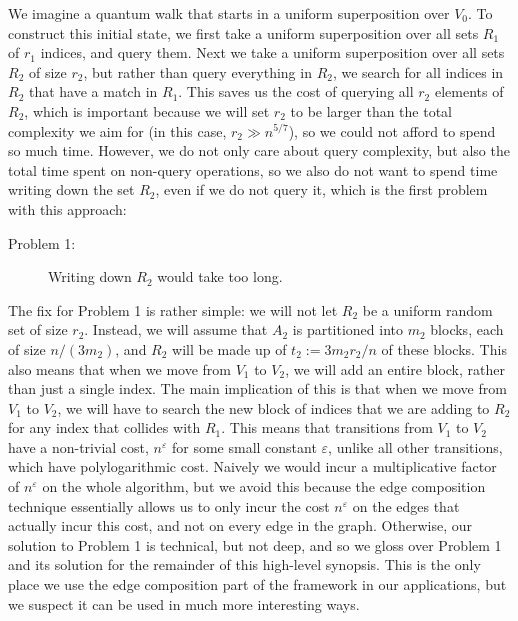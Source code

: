 \documentclass{theoretics}
\renewcommand{\>}{\rangle}
\newcommand{\<}{\langle}
\renewcommand{\(}{\left(}
\renewcommand{\)}{\right)}
\newcommand{\eps}{\varepsilon}
\begin{document}
We imagine a quantum walk that starts in a uniform superposition over $V_0$. To construct this initial state, we first take a uniform superposition over all sets $R_1$ of $r_1$ indices, and query them. Next we take a uniform superposition over all sets $R_2$ of size $r_2$, but rather than query everything in $R_2$, we search for all indices in $R_2$ that have a match in $R_1$. This saves us the cost of querying all $r_2$ elements of $R_2$, which is important because we will set $r_2$ to be larger than the total complexity we aim for (in this case, $r_2 \gg n^{5/7}$), so we could not afford to spend so much time. However, we do not only care about query complexity, but also the total time spent on non-query operations, so we also do not want to spend time writing down the set $R_2$, even if we do not query it, which is the first problem with this approach:
\begin{description}
\item[Problem 1:] Writing down $R_2$ would take too long. 
\end{description}
The fix for Problem 1 is rather simple: we will not let $R_2$ be a uniform random set of size $r_2$. Instead, we will assume that $A_2$ is partitioned into $m_2$ blocks, each of size $n/(3m_2)$, and $R_2$ will be made up of $t_2:=3m_2r_2/n$ of these blocks. This also means that when we move from $V_1$ to $V_2$, we will add an entire block, rather than just a single index. The main implication of this is that when we move from $V_1$ to $V_2$, we will have to search the new block of indices that we are adding to $R_2$ for any index that collides with $R_1$. This means that transitions from $V_1$ to $V_2$ have a non-trivial cost, $n^{\eps}$ for some small constant $\eps$, unlike all other transitions, which have polylogarithmic cost. Naively we would incur a multiplicative factor of $n^\eps$ on the whole algorithm, but we avoid this because the edge composition technique essentially allows us to only incur the cost $n^{\eps}$ on the edges that actually incur this cost, and not on every edge in the graph. Otherwise, our solution to Problem 1 is technical, but not deep, and so we gloss over Problem 1 and its solution for the remainder of this high-level synopsis. This is the only place we use the edge composition part of the framework in our applications, but we suspect it can be used in much more interesting ways. 
\end{document}
